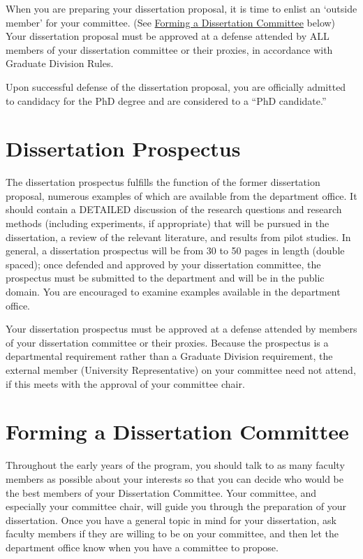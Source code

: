 \documentclass[
]{book}
\begin{document}
When you are preparing your dissertation proposal, it is time to enlist an `outside member' for your committee. (See \hyperref[forming-a-dissertation-committee]{Forming a Dissertation Committee} below) Your dissertation proposal must be approved at a defense attended by ALL members of your dissertation committee or their proxies, in accordance with Graduate Division Rules.

Upon successful defense of the dissertation proposal, you are officially admitted to candidacy for the PhD degree and are considered to a ``PhD candidate.''

\section{Dissertation Prospectus}\label{dissertation-prospectus}

The dissertation prospectus fulfills the function of the former dissertation proposal, numerous examples of which are available from the department office. It should contain a DETAILED discussion of the research questions and research methods (including experiments, if appropriate) that will be pursued in the dissertation, a review of the relevant literature, and results from pilot studies. In general, a dissertation prospectus will be from 30 to 50 pages in length (double spaced); once defended and approved by your dissertation committee, the prospectus must be submitted to the department and will be in the public domain. You are encouraged to examine examples available in the department office.

Your dissertation prospectus must be approved at a defense attended by members of your dissertation committee or their proxies. Because the prospectus is a departmental requirement rather than a Graduate Division requirement, the external member (University Representative) on your committee need not attend, if this meets with the approval of your committee chair.

\section{Forming a Dissertation Committee}\label{forming-a-dissertation-committee}

Throughout the early years of the program, you should talk to as many faculty members as possible about your interests so that you can decide who would be the best members of your Dissertation Committee. Your committee, and especially your committee chair, will guide you through the preparation of your dissertation. Once you have a general topic in mind for your dissertation, ask faculty members if they are willing to be on your committee, and then let the department office know when you have a committee to propose.
\end{document}
